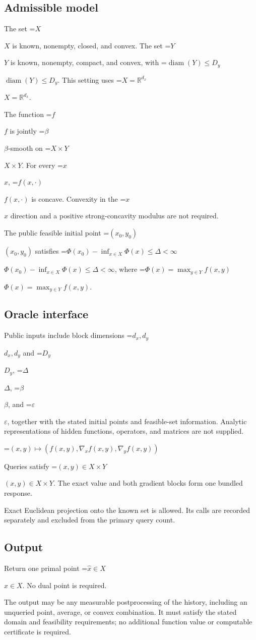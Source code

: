\documentclass[10pt,a4paper]{article}
\newcommand{\AtlasMath}[1]{\par\begingroup\centering\setbox0=\hbox{$\displaystyle #1$}\ifdim\wd0>1.4\linewidth\typeout{ATLAS WIDE FORMULA: \the\wd0}\fi\ifdim\wd0>\linewidth\resizebox{\linewidth}{!}{\box0}\else\box0\fi\par\endgroup}
\newcommand{\AtlasInlineMath}[1]{\begingroup\setbox0=\hbox{$#1$}\ifdim\wd0>.4\linewidth\endgroup\AtlasMath{#1}\else\endgroup$#1$\fi}
\begin{document}
\subsection{Admissible model}
The set \AtlasInlineMath{X} is known, nonempty, closed, and convex. The set \AtlasInlineMath{Y} is known, nonempty, compact, and convex, with \AtlasInlineMath{\operatorname{diam}(Y)\le D_y}. This setting uses \AtlasInlineMath{X=\mathbb{R}^{d_x}}.

The function \AtlasInlineMath{f} is jointly \AtlasInlineMath{\beta}-smooth on \AtlasInlineMath{X\times Y}. For every \AtlasInlineMath{x}, \AtlasInlineMath{f(x,\cdot)} is concave. Convexity in the \AtlasInlineMath{x} direction and a positive strong-concavity modulus are not required.

The public feasible initial point \AtlasInlineMath{(x_0,y_0)} satisfies \AtlasInlineMath{\Phi(x_0)-\inf_{x\in X}\Phi(x)\le\Delta<\infty}, where \AtlasInlineMath{\Phi(x)=\max_{y\in Y}f(x,y)}.

\subsection{Oracle interface}
Public inputs include block dimensions \AtlasInlineMath{d_x,d_y} and \AtlasInlineMath{D_y}, \AtlasInlineMath{\Delta}, \AtlasInlineMath{\beta}, and \AtlasInlineMath{\varepsilon}, together with the stated initial points and feasible-set information. Analytic representations of hidden functions, operators, and matrices are not supplied.


\AtlasMath{(x,y)\longmapsto(f(x,y),\nabla_xf(x,y),\nabla_yf(x,y))}


Queries satisfy \AtlasInlineMath{(x,y)\in X\times Y}. The exact value and both gradient blocks form one bundled response.

Exact Euclidean projection onto the known set is allowed. Its calls are recorded separately and excluded from the primary query count.

\subsection{Output}
Return one primal point \AtlasInlineMath{\widehat x\in X}. No dual point is required.

The output may be any measurable postprocessing of the history, including an unqueried point, average, or convex combination. It must satisfy the stated domain and feasibility requirements; no additional function value or computable certificate is required.
\end{document}
